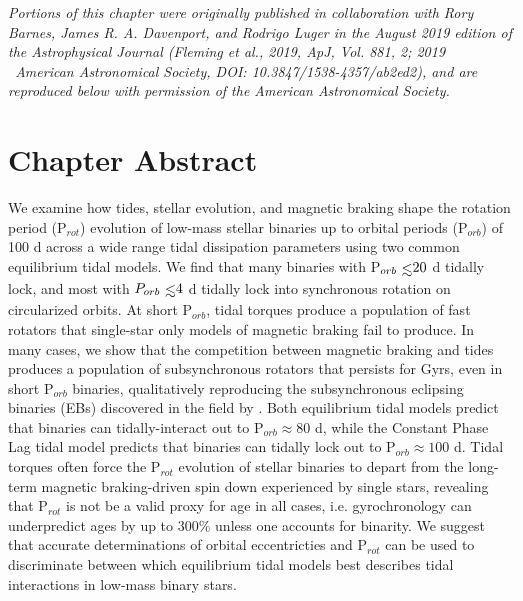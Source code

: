 \textit{Portions of this chapter were originally published in collaboration with Rory Barnes, James R. A. Davenport, and Rodrigo Luger in the August 2019 edition of the Astrophysical Journal (Fleming et al., 2019, ApJ, Vol. 881, 2; 2019 \textcopyright \ American Astronomical Society, DOI: 10.3847/1538-4357/ab2ed2), and are reproduced below with permission of the American Astronomical Society.}

\section{Chapter Abstract}

We examine how tides, stellar evolution, and magnetic braking shape the rotation period (P$_{rot}$) evolution of low-mass stellar binaries up to orbital periods (P$_{orb}$) of 100 d across a wide range tidal dissipation parameters using two common equilibrium tidal models. We find that many binaries with P$_{orb} \lsim 20$ d tidally lock, and most with $P_{orb} \lsim 4$ d tidally lock into synchronous rotation on circularized orbits. At short P$_{orb}$, tidal torques produce a population of fast rotators that single-star only models of magnetic braking fail to produce.  In many cases, we show that the competition between magnetic braking and tides produces a population of subsynchronous rotators that persists for Gyrs, even in short P$_{orb}$ binaries, qualitatively reproducing the subsynchronous eclipsing binaries (EBs) discovered in the \kepler field by \citet{Lurie2017}. Both equilibrium tidal models predict that binaries can tidally-interact out to P$_{orb} \approx 80$ d, while the Constant Phase Lag tidal model predicts that binaries can tidally lock out to P$_{orb} \approx 100$ d. Tidal torques often force the P$_{rot}$ evolution of stellar binaries to depart from the long-term magnetic braking-driven spin down experienced by single stars, revealing that P$_{rot}$ is not be a valid proxy for age in all cases, i.e. gyrochronology can underpredict ages by up to $300\%$ unless one accounts for binarity. We suggest that accurate determinations of orbital eccentricties and P$_{rot}$ can be used to discriminate between which equilibrium tidal models best describes tidal interactions in low-mass binary stars.

